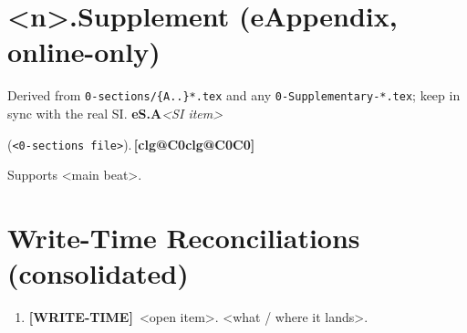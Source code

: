 \documentclass[11pt]{article}
\makeatletter
\newcommand{\wt}[1]{\textcolor{cTodo}{\textbf{[WRITE-TIME]}~#1}}
\newcommand{\cl@gloss}[1]{\ifcsname clg@#1\endcsname\csname clg@#1\endcsname\else #1\fi}
\newcommand{\cl}[1]{\,\textcolor{cClaim}{\footnotesize\textbf{[\cl@gloss{#1}]}}}
\newcommand{\pspine}[2]{\medskip\noindent\textbf{#1}\;\textbar\;\textit{#2}\par\nopagebreak}
\makeatother
\begin{document}

\hrulefill

\section*{<n>.\quad Supplement (eAppendix, online-only)}
\noindent\footnotesize Derived from \texttt{0-sections/\{A..\}*.tex} and any
\texttt{0-Supplementary-*.tex}; keep in sync with the real SI.\normalsize
\pspine{eS.A}{<SI item>}
\begin{spts}
\item <what it contains> (\texttt{<0-sections file>}).\cl{C0}
\item Supports <main beat>.
\end{spts}

\hrulefill

\section*{Write-Time Reconciliations (consolidated)}
\begin{enumerate}[leftmargin=*]
\item \wt{<open item>.} <what / where it lands>.
\end{enumerate}

\end{document}
